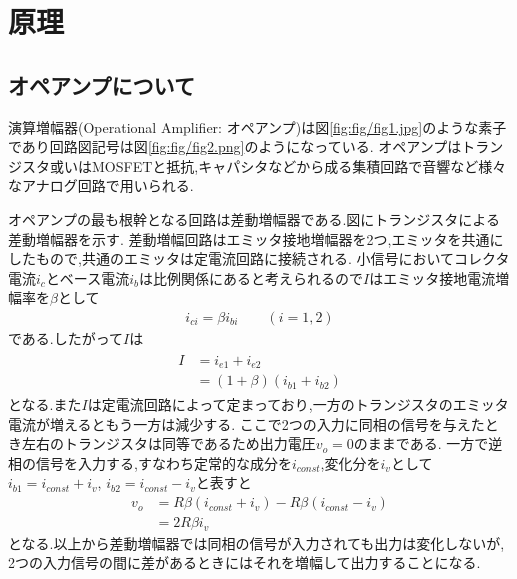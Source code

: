 \section{原理}
\subsection{オペアンプについて}
演算増幅器(Operational Amplifier: オペアンプ)は図\ref{fig:fig/fig1.jpg}のような素子であり回路図記号は図\ref{fig:fig/fig2.png}のようになっている.
オペアンプはトランジスタ或いはMOSFETと抵抗,キャパシタなどから成る集積回路で音響など様々なアナログ回路で用いられる.

オペアンプの最も根幹となる回路は差動増幅器である.\cite{densikairo}図にトランジスタによる差動増幅器を示す.
差動増幅回路はエミッタ接地増幅器を2つ,エミッタを共通にしたもので,共通のエミッタは定電流回路に接続される.
小信号においてコレクタ電流$i_c$とベース電流$i_b$は比例関係にあると考えられるので$I$はエミッタ接地電流増幅率を$\beta$として
\begin{align}
  i_{ci}=\beta i_{bi}\qquad(i=1,2)
\end{align}
である.したがって$I$は
\begin{align}
  \begin{split}
    I&=i_{e1}+i_{e2}\\
    &=(1+\beta)(i_{b1}+i_{b2})
  \end{split}
\end{align}
となる.また$I$は定電流回路によって定まっており,一方のトランジスタのエミッタ電流が増えるともう一方は減少する.
ここで2つの入力に同相の信号を与えたとき左右のトランジスタは同等であるため出力電圧$v_o=0$のままである.
一方で逆相の信号を入力する,すなわち定常的な成分を$i_{const}$,変化分を$i_v$として$i_{b1}=i_{const}+i_v$,
$i_{b2}=i_{const}-i_v$と表すと
\begin{align}
  v_o&=R\beta(i_{const}+i_v)-R\beta(i_{const}-i_v)\\
  &=2R\beta i_v
\end{align}
となる.以上から差動増幅器では同相の信号が入力されても出力は変化しないが,
2つの入力信号の間に差があるときにはそれを増幅して出力することになる.

